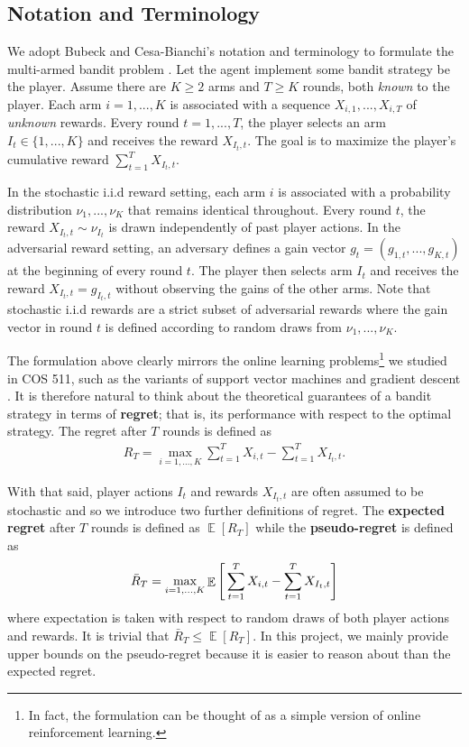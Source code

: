 \documentclass[12pt]{article}
\DeclareMathOperator*{\E}{\mathbb{E}}
\begin{document}
\subsection{Notation and Terminology}

We adopt Bubeck and Cesa-Bianchi's notation and terminology to formulate the multi-armed bandit problem \cite{bubeck2012}. Let the agent implement some bandit strategy be the player. Assume there are $K\geq 2$ arms and $T\geq K$ rounds, both \textit{known} to the player. Each arm $i=1,...,K$ is associated with a sequence $X_{i,1},...,X_{i,T}$ of \textit{unknown} rewards. Every round $t=1,...,T$, the player selects an arm $I_{t}\in\{1,...,K\}$ and receives the reward $X_{I_{t},t}$. The goal is to maximize the player's cumulative reward $\sum_{t=1}^{T}X_{I_{t},t}$.

In the stochastic i.i.d reward setting, each arm $i$ is associated with a probability distribution $\nu_{1},...,\nu_{K}$ that remains identical throughout. Every round $t$, the reward $X_{I_{t},t}\sim\nu_{I_{t}}$ is drawn independently of past player actions. In the adversarial reward setting, an adversary defines a gain vector $g_{t}=(g_{1,t},...,g_{K,t})$ at the beginning of every round $t$. The player then selects arm $I_{t}$ and receives the reward $X_{I_{t},t}=g_{I_{t},t}$ without observing the gains of the other arms. Note that stochastic i.i.d rewards are a strict subset of adversarial rewards where the gain vector in round $t$ is defined according to random draws from $\nu_{1},...,\nu_{K}$.

The formulation above clearly mirrors the online learning problems\footnote{In fact, the formulation can be thought of as a simple version of online reinforcement learning.} we studied in COS 511, such as the variants of support vector machines \cite{lecture16} and gradient descent \cite{lecture18}. It is therefore natural to think about the theoretical guarantees of a bandit strategy in terms of \textbf{regret}; that is, its performance with respect to the optimal strategy. The regret after $T$ rounds is defined as
\begin{align}
R_{T}=\max_{i=1,...,K}\sum_{t=1}^{T}X_{i,t}-\sum_{t=1}^{T}X_{I_{t},t}.
\end{align}

With that said, player actions $I_{t}$ and rewards $X_{I_{t},t}$ are often assumed to be stochastic and so we introduce two further definitions of regret. The \textbf{expected regret} after $T$ rounds is defined as $\E[R_T]$ while the \textbf{pseudo-regret} is defined as 
\begin{gather}
\bar{R}_{T}=\max_{i=1,...,K}\E\Bigg{[}\sum_{t=1}^{T}X_{i,t}-\sum_{t=1}^{T}X_{I_{t},t}\Bigg{]}
\end{gather}
where expectation is taken with respect to random draws of both player actions and rewards. It is trivial that $\bar{R}_{T}\leq\E[R_{T}]$. In this project, we mainly provide upper bounds on the pseudo-regret because it is easier to reason about than the expected regret.
\end{document}
